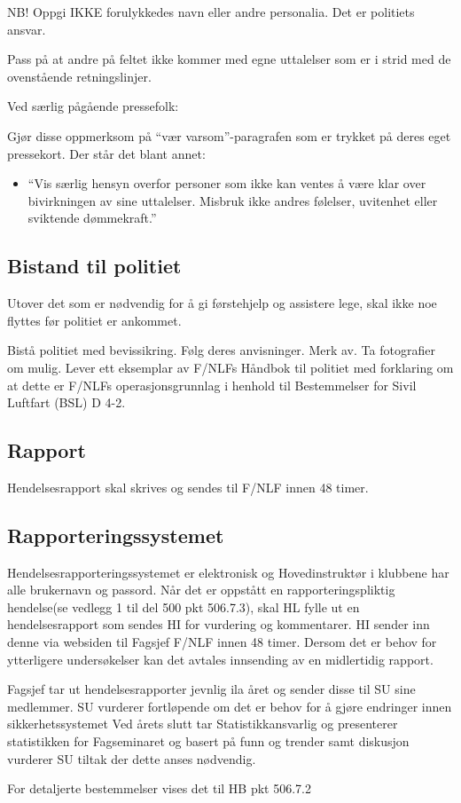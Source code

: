 NB! Oppgi IKKE forulykkedes navn eller andre personalia. Det er politiets ansvar.

Pass på at andre på feltet ikke kommer med egne uttalelser som er i strid med de ovenstående retningslinjer.

Ved særlig pågående pressefolk:

Gjør disse oppmerksom på ``vær varsom''-paragrafen som er trykket på deres eget pressekort. Der står det blant annet:
\begin{itemize}
	\item ``Vis særlig hensyn overfor personer som ikke kan ventes å være klar over bivirkningen av sine uttalelser. Misbruk ikke andres følelser, uvitenhet eller sviktende dømmekraft.''
\end{itemize}

\subsection{Bistand til politiet}
Utover det som er nødvendig for å gi førstehjelp og assistere lege, skal ikke noe flyttes før politiet er ankommet.

Bistå politiet med bevissikring. Følg deres anvisninger. Merk av. Ta fotografier om mulig. Lever ett eksemplar av F/NLFs Håndbok til politiet med forklaring om at dette er F/NLFs operasjonsgrunnlag i henhold til Bestemmelser for Sivil Luftfart (BSL) D 4-2.

\subsection{Rapport}
Hendelsesrapport skal skrives og sendes til F/NLF innen 48 timer.

\subsection{Rapporteringssystemet}
Hendelsesrapporteringssystemet er elektronisk og Hovedinstruktør i klubbene har alle brukernavn og passord. Når det er oppstått en rapporteringspliktig hendelse(se vedlegg 1 til del 500 pkt 506.7.3), skal HL fylle ut en hendelsesrapport som sendes HI for vurdering og kommentarer. HI sender inn denne via websiden til Fagsjef F/NLF innen 48 timer. Dersom det er behov for ytterligere undersøkelser kan det avtales innsending av en midlertidig rapport.

Fagsjef tar ut hendelsesrapporter jevnlig ila året og sender disse til SU sine medlemmer. SU vurderer fortløpende om det er behov for å gjøre endringer innen sikkerhetssystemet Ved årets slutt tar Statistikkansvarlig og presenterer statistikken for Fagseminaret og basert på funn og trender samt diskusjon vurderer SU tiltak der dette anses nødvendig.

For detaljerte bestemmelser vises det til HB pkt 506.7.2